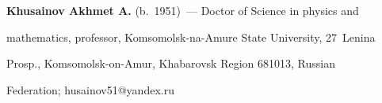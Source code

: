 \noindent


\textbf{Khusainov Akhmet A.} (b.\ 1951)~--- Doctor of Science in physics and 


mathematics, professor, Komsomolsk-na-Amure State University, 27~Lenina 


Prosp., Komsomolsk-on-Amur, Khabarovsk Region 681013, Russian 


Federation; \mbox{husainov51@yandex.ru}














\label{end\stat}





\renewcommand{\bibname}{\protect\rm Литература} 


